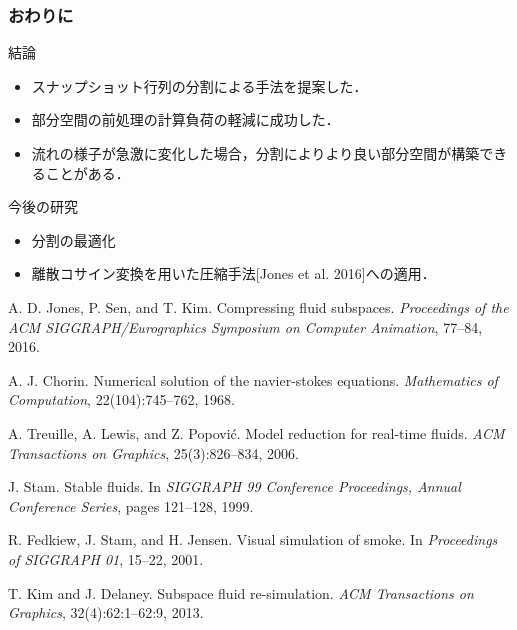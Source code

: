 \documentclass[aspectratio=169,dvipdfmx,hyperref={bookmarks=true}]{beamer}
\begin{document}
 \begin{frame}
 \frametitle{おわりに}
\begin{block}{結論}
\begin{itemize}
	\item スナップショット行列の分割による手法を提案した．
	\item 部分空間の前処理の計算負荷の軽減に成功した．
	\item 流れの様子が急激に変化した場合，分割によりより良い部分空間が構築できることがある．
\end{itemize}
\end{block}
\begin{block}{今後の研究}
\begin{itemize}
	\item 分割の最適化
	\item 離散コサイン変換を用いた圧縮手法[Jones et al. 2016]への適用．
\end{itemize}
\end{block}
\end{frame}
\begin{thebibliography}{99}
\beamertemplatetextbibitems
{}
A. D. Jones, P. Sen, and T. Kim. Compressing fluid subspaces. \textit{Proceedings of the ACM SIGGRAPH/Eurographics Symposium on Computer Animation}, 77--84, 2016.

A. J. Chorin. Numerical solution of the navier-stokes equations. \textit{Mathematics of Computation}, 22(104):745--762, 1968.

A. Treuille, A. Lewis, and Z. Popovi\'{c}. Model reduction for real-time fluids. \textit{ACM Transactions on Graphics}, 25(3):826--834, 2006.

J. Stam. Stable fluids. In \textit{SIGGRAPH 99 Conference Proceedings, Annual Conference Series}, pages 121--128, 1999.

R. Fedkiew, J. Stam, and H. Jensen. Visual simulation of smoke. In \textit{Proceedings of SIGGRAPH 01}, 15--22, 2001.

T. Kim and J. Delaney. Subspace fluid re-simulation. \textit{ACM Transactions on Graphics}, 32(4):62:1--62:9, 2013.


\end{thebibliography}
\end{document}
